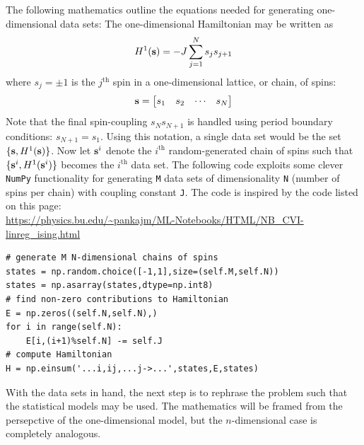 \documentclass[nofootinbib,reprint,english]{revtex4-1}
\begin{document}
The following mathematics outline the equations needed for generating one-dimensional data sets: The one-dimensional Hamiltonian may be written as
\begin{equation}\label{eq:one_dim_Ising_Hamiltonian}
H^1(\vb{s})=-J\sum_{j=1}^Ns_js_{j+1}
\end{equation}
where \(s_j=\pm1\) is the \(j^\text{th}\) spin in a one-dimensional lattice, or chain, of spins:
\[\vb{s}=\mqty[s_1&s_2&\cdots&s_N]\]
Note that the final spin-coupling \(s_Ns_{N+1}\) is handled using period boundary conditions: \(s_{N+1}=s_1\). Using this notation, a single data set would be the set \(\{\vb{s},H^1(\vb{s})\}\). Now let \(\vb{s}^i\) denote the \(i^\text{th}\) random-generated chain of spins such that \(\{\vb{s}^i,H^1(\vb{s}^i)\}\) becomes the \(i^\text{th}\) data set. The following code exploits some clever \texttt{NumPy} functionality for generating \texttt{M} data sets of dimensionality \texttt{N} (number of spins per chain) with coupling constant \texttt{J}. The code is inspired by the code listed on this page:\\
{\scriptsize\url{https://physics.bu.edu/~pankajm/ML-Notebooks/HTML/NB_CVI-linreg_ising.html}}
\begin{lstlisting}[caption={\texttt{Python 3} code for generating 1D data sets},label={lst:generate_1D_data}]
# generate M N-dimensional chains of spins
states = np.random.choice([-1,1],size=(self.M,self.N))
states = np.asarray(states,dtype=np.int8)
# find non-zero contributions to Hamiltonian
E = np.zeros((self.N,self.N),)
for i in range(self.N):
	E[i,(i+1)%self.N] -= self.J
# compute Hamiltonian
H = np.einsum('...i,ij,...j->...',states,E,states)
\end{lstlisting}
With the data sets in hand, the next step is to rephrase the problem such that the statistical models may be used. The mathematics will be framed from the persepctive of the one-dimensional model, but the \(n\)-dimensional case is completely analogous.
\end{document}
